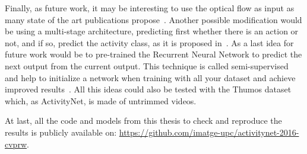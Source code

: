 Finally, as future work, it may be interesting to use the optical flow as input as many state of the art publications propose~\cite{simonyan2014two,Ng_2015_CVPR,yao2015describing}. Another possible modification would be using a multi-stage architecture, predicting first whether there is an action or not, and if so, predict the activity class, as it is proposed in~\cite{shoutemporal}.
As a last idea for future work would be to pre-trained the Recurrent Neural Network to predict the next output from the current output. This technique is called semi-supervised and help to initialize a network when training with all your dataset and achieve improved results~\cite{harvey2015semi}.
All this ideas could also be tested with the Thumos dataset which, as ActivityNet, is made of untrimmed videos.

At last, all the code and models from this thesis to check and reproduce the results is publicly available on: \url{https://github.com/imatge-upc/activitynet-2016-cvprw}.
